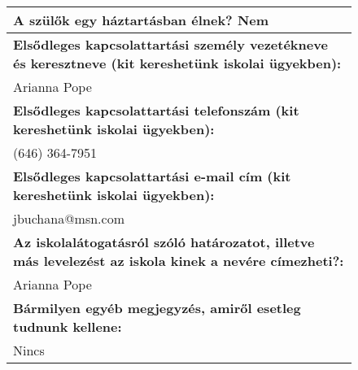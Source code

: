 \documentclass[10pt,a4paper]{article}
\begin{document}
\begin{figure}[!ht]
\begin{tabular}{|m{\textwidth}|}
\hline\vspace{3pt}
\textbf{A szülők egy háztartásban élnek? } \hspace{0.5cm} Nem \vspace{3pt} \\
\hline\vspace{3pt}
\textbf{Elsődleges kapcsolattartási személy vezetékneve és keresztneve (kit kereshetünk iskolai ügyekben):} \\ \hspace{0.5cm} Arianna Pope \vspace{3pt} \\
\hline\vspace{3pt}
\textbf{Elsődleges kapcsolattartási telefonszám (kit kereshetünk iskolai ügyekben):} \\ \hspace{0.5cm} (646) 364-7951 \vspace{3pt} \\
\hline\vspace{3pt}
\textbf{Elsődleges kapcsolattartási e-mail cím (kit kereshetünk iskolai ügyekben):} \\ \hspace{0.5cm} jbuchana@msn.com \vspace{3pt} \\
\hline\vspace{3pt}
\textbf{Az iskolalátogatásról szóló határozatot, illetve más levelezést az iskola kinek a nevére címezheti?:} \\ \hspace{0.5cm} Arianna Pope \vspace{3pt} \\
\hline\vspace{3pt}
\textbf{Bármilyen egyéb megjegyzés, amiről esetleg tudnunk kellene:} \\ \hspace{0.5cm} Nincs \vspace{3pt} \\


\end{tabular}
\end{figure}
\end{document}
